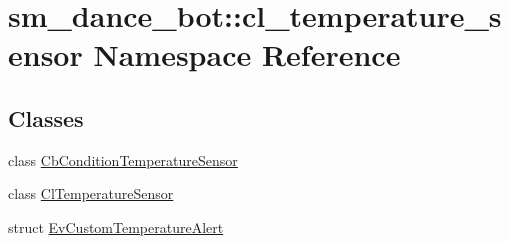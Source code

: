 \hypertarget{namespacesm__dance__bot_1_1cl__temperature__sensor}{}\section{sm\+\_\+dance\+\_\+bot\+:\+:cl\+\_\+temperature\+\_\+sensor Namespace Reference}
\label{namespacesm__dance__bot_1_1cl__temperature__sensor}
\subsection*{Classes}
\begin{DoxyCompactItemize}
\item 
class \hyperlink{classsm__dance__bot_1_1cl__temperature__sensor_1_1CbConditionTemperatureSensor}{Cb\+Condition\+Temperature\+Sensor}
\item 
class \hyperlink{classsm__dance__bot_1_1cl__temperature__sensor_1_1ClTemperatureSensor}{Cl\+Temperature\+Sensor}
\item 
struct \hyperlink{structsm__dance__bot_1_1cl__temperature__sensor_1_1EvCustomTemperatureAlert}{Ev\+Custom\+Temperature\+Alert}
\end{DoxyCompactItemize}
